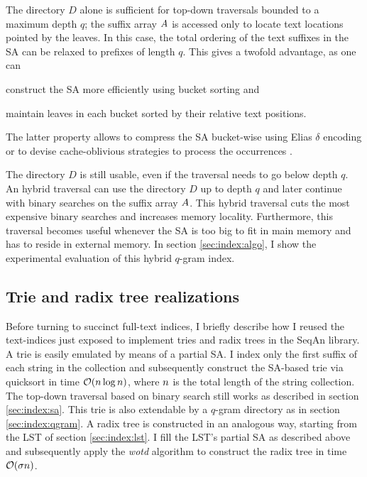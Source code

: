 The directory $D$ alone is sufficient for top-down traversals bounded to a maximum depth $q$;
the suffix array $A$ is accessed only to locate text locations pointed by the leaves.
In this case, the total ordering of the text suffixes in the SA can be relaxed to prefixes of length $q$.
This gives a twofold advantage, as one can
\begin{inparaenum}[(i)]
\item construct the SA more efficiently using bucket sorting and
\item maintain leaves in each bucket sorted by their relative text positions.
\end{inparaenum}
The latter property allows to compress the SA bucket-wise \eg using Elias $\delta$ encoding \citep{Elias1975} or to devise cache-oblivious strategies to process the occurrences \citep{Hach2010}.

The directory $D$ is still usable, even if the traversal needs to go below depth $q$.
An hybrid traversal can use the directory $D$ up to depth $q$ and later continue with binary searches on the suffix array $A$.
This hybrid traversal cuts the most expensive binary searches and increases memory locality.
Furthermore, this traversal becomes useful whenever the SA is too big to fit in main memory and has to reside in external memory.
In section \ref{sec:index:algo}, I show the experimental evaluation of this hybrid $q$-gram index.

\subsection{Trie and radix tree realizations}
\label{sec:index:trie}

Before turning to succinct full-text indices, I briefly describe how I reused the text-indices just exposed to implement tries and radix trees in the SeqAn library.
A trie is easily emulated by means of a partial SA.
I index only the first suffix of each string in the collection and subsequently construct the SA-based trie via quicksort in time $\mathcal{O}(n \log{n})$, where $n$ is the total length of the string collection.
The top-down traversal based on binary search still works as described in section \ref{sec:index:sa}.
This trie is also extendable by a $q$-gram directory as in section \ref{sec:index:qgram}.
A radix tree is constructed in an analogous way, starting from the LST of section \ref{sec:index:lst}.
I fill the LST's partial SA as described above and subsequently apply the \emph{wotd} algorithm \citep{Giegerich1999} to construct the radix tree in time $\mathcal{O}(\sigma n)$.


